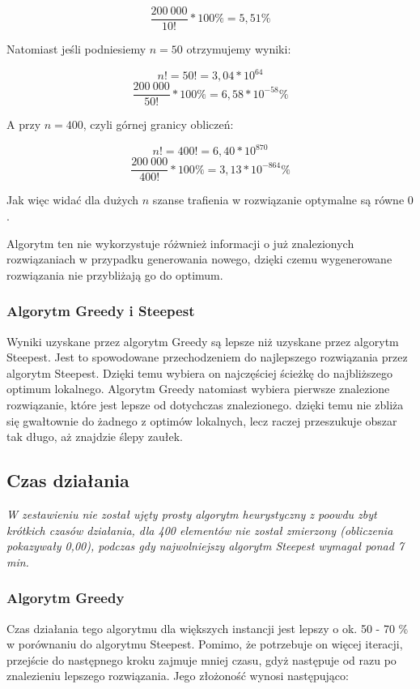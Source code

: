 $$ \frac{200~000}{10!} * 100\% = 5,51\%  $$

Natomiast jeśli podniesiemy $ n = 50 $ otrzymujemy wyniki:

$$ n! = 50! = 3,04 * 10^{64} $$
$$ \frac{200~000}{50!} * 100\% = 6,58 * 10^{-58}\%  $$

A przy $ n = 400 $, czyli górnej granicy obliczeń:

$$ n! = 400! = 6,40 * 10^{870} $$
$$ \frac{200~000}{400!} * 100\% = 3,13 * 10^{-864}\%  $$

Jak więc widać dla dużych $ n $ szanse trafienia w rozwiązanie optymalne są równe $ 0 $.

Algorytm ten nie wykorzystuje różwnież informacji o już znalezionych rozwiązaniach 
w przypadku generowania nowego, dzięki czemu wygenerowane rozwiązania nie przybliżają
go do optimum.

\subsubsection{Algorytm Greedy i Steepest}

Wyniki uzyskane przez algorytm Greedy są lepsze niż uzyskane przez algorytm Steepest. 
Jest to spowodowane przechodzeniem do najlepszego rozwiązania przez algorytm Steepest. 
Dzięki temu wybiera on najczęściej ścieżkę do najbliższego optimum lokalnego. Algorytm
Greedy natomiast wybiera pierwsze znalezione rozwiązanie, które jest lepsze od dotychczas 
znalezionego. dzięki temu nie zbliża się gwałtownie do żadnego z optimów lokalnych, lecz 
raczej przeszukuje obszar tak długo, aż znajdzie ślepy zaułek.


\subsection{Czas działania}

\it
W zestawieniu nie został ujęty prosty algorytm heurystyczny z poowdu zbyt krótkich czasów 
działania, dla 400 elementów nie został zmierzony (obliczenia pokazywały 0,00), podczas 
gdy najwolniejszy algorytm Steepest wymagał ponad 7 min.
\rm

\subsubsection{Algorytm Greedy}

Czas działania tego algorytmu dla większych instancji jest lepszy o ok. 50 - 70 \% w porównaniu 
do algorytmu Steepest. Pomimo, że potrzebuje on więcej iteracji, przejście do następnego kroku 
zajmuje mniej czasu, gdyż następuje od razu po znalezieniu lepszego rozwiązania. Jego złożoność 
wynosi następująco:

